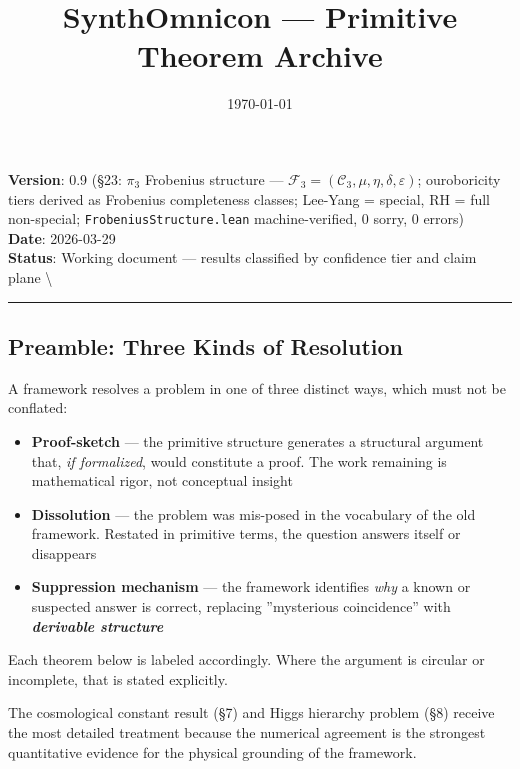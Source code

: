 \documentclass[12pt,a4paper]{article}
\newcommand{\pilcrow}{\S}
\begin{document}
\title{SynthOmnicon --- Primitive Theorem Archive}
\date{\today}

\maketitle

\textbf{Version}: 0.9 (\pilcrow{}23: $\pi_3$ Frobenius structure --- $\mathcal{F}_3 = (\mathcal{C}_3, \mu, \eta, \delta, \varepsilon)$; ouroboricity tiers derived as Frobenius completeness classes; Lee-Yang = special, RH = full non-special; \texttt{FrobeniusStructure.lean} machine-verified, 0 sorry, 0 errors)   \\
\textbf{Date}: 2026-03-29   \\
\textbf{Status}: Working document --- results classified by confidence tier and claim plane  \textbackslash{}

\begin{center}
\rule{0.5\textwidth}{0.4pt}
\end{center}

\subsection{Preamble: Three Kinds of Resolution}

A framework resolves a problem in one of three distinct ways, which must not be conflated:

\begin{itemize}
    \item \textbf{Proof-sketch} --- the primitive structure generates a structural argument that, \emph{if formalized}, would constitute a proof. The work remaining is mathematical rigor, not conceptual insight
    \item \textbf{Dissolution} --- the problem was mis-posed in the vocabulary of the old framework. Restated in primitive terms, the question answers itself or disappears
    \item \textbf{Suppression mechanism} --- the framework identifies \emph{why} a known or suspected answer is correct, replacing ''mysterious coincidence'' with \emph{\textbf{derivable structure}}
\end{itemize}

Each theorem below is labeled accordingly. Where the argument is circular or incomplete, that is stated explicitly.

The cosmological constant result (\pilcrow{}7) and Higgs hierarchy problem (\pilcrow{}8) receive the most detailed treatment because the numerical agreement is the strongest quantitative evidence for the physical grounding of the framework.
\end{document}
